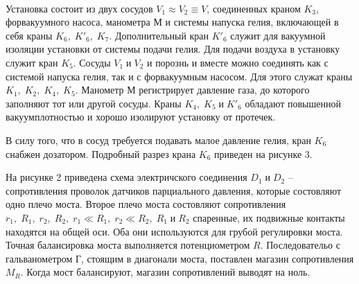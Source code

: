 \documentclass[a4paper,12pt]{article}
\begin{document}
\paragraph{}
Установка состоит из двух сосудов $V_1 \approx V_2 \equiv V$, соединенных краном $K_3$, форвакуумного насоса, манометра М и системы напуска гелия, включающей в себя краны $K_6, \; K'_6,\; K_7$. Дополнительный кран $K'_6$ служит для вакуумной изоляции установки от системы подачи гелия. Для подачи воздуха в установку служит кран $K_5$. Сосуды $V_1 \; \text{и} \; V_2$ и порознь и вместе можно соединять как с системой напуска гелия, так и с форвакуумным насосом. Для этого служат краны $K_1,\; K_2,\; K_4,\; K_5$. Манометр М регистрирует давление газа, до которого заполняют тот или другой сосуды. Краны $K_4,\; K_5 \; \text{и} \; K'_6$ обладают повышенной вакуумплотностью и хорошо изолируют установку от протечек.

В силу того, что в сосуд требуется подавать малое давление гелия, кран $K_6$ снабжен дозатором. Подробный разрез крана $K_6$ приведен на рисунке 3.

На рисунке 2 приведена схема электричского соединения $D_1 \; \text{и} \; D_2$ -- сопротивления проволок датчиков парциального давления, которые состовляют одно плечо моста. Второе плечо моста состовляют сопротивления $r_1, \; R_1, \; r_2, \; R_2, \; r_1 \ll R_1, \; r_2 \ll R_2, \; R_1 \; \text{и} \; R_2$ спаренные, их подвижные контакты находятся на общей оси. Оба они используются для грубой регулировки моста. Точная балансировка моста выполняется потенциометром $R$. Последовательо с гальванометром Г, стоящим в диагонали моста, поставлен магазин сопротивления $M_R$. Когда мост балансируют, магазин сопротивлений выводят на ноль. 
\end{document}
